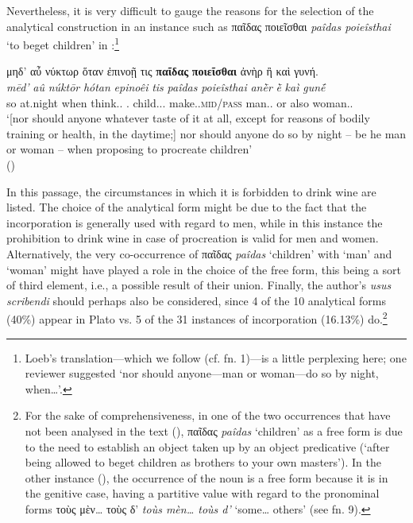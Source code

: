 \documentclass[output=paper,colorlinks,citecolor=brown]{langscibook}
\begin{document}
Nevertheless, it is very difficult to gauge the reasons for the selection of the analytical construction in an instance such as παῖδας ποιεῖσθαι \textit{paîdas poieîsthai} `to beget children' in :\footnote{Loeb's translation---which we follow (cf. fn. 1)---is a little perplexing here; one reviewer suggested `nor should anyone---man or woman---do so by night, when\ldots{}'.}

\ea \label{ex:12}
\glll μηδ’	αὖ	νύκτωρ	ὅταν		ἐπινοῇ		  τις		\textbf{παῖδας} \textbf{ποιεῖσθαι} 		ἀνὴρ		ἢ	καὶ	γυνή. \\
\textit{mēd’}	\textit{aû}	\textit{núktōr}		\textit{hótan}		\textit{epinoêi}		  \textit{tis}		\textit{paîdas} \textit{poieîsthai} 		\textit{anḕr}		\textit{ḕ}	\textit{kaì}	\textit{gunḗ}\\
\Neg{} so at.night when think.\Sbjv{}.\Tsg{} \Indf{}.\Nom{} child.\Acc{}.\M{}.\Pl{} make.\Inf{}.\textsc{mid/pass} man.\Nom{}.\M{} or also woman.\Nom{}.\F{}\\
\glt `[nor should anyone whatever taste of it at all, except for reasons of bodily training or health, in the daytime;] nor should anyone do so by night – be he man or woman – when proposing to procreate children' \\
\hspace*{\fill}()
\z

In this passage, the circumstances in which it is forbidden to drink wine are listed. The choice of the analytical form might be due to the fact that the incorporation is generally used with regard to men, while in this instance the prohibition to drink wine in case of procreation is valid for men and women. Alternatively, the very co-occurrence of παῖδας \textit{paîdas} `children' with `man' and `woman' might have played a role in the choice of the free form, this being a sort of third element, i.e., a possible result of their union. Finally, the author's \textit{usus scribendi} should perhaps also be considered, since 4 of the 10 analytical forms (40\%) appear in Plato vs. 5 of the 31 instances of incorporation (16.13\%) do.\footnote{For the sake of comprehensiveness, in one of the two occurrences that have not been analysed in the text (), παῖδας \textit{paîdas} `children' as a free form is due to the need to establish an object taken up by an object predicative (`after being allowed to beget children as brothers to your own masters'). In the other instance (), the occurrence of the noun is a free form because it is in the genitive case, having a partitive value with regard to the pronominal forms τοὺς μὲν\ldots{} τοὺς δ’ \textit{toùs mèn\ldots{} toùs d’} `some\ldots{} others' (see fn. 9).}
\end{document}
